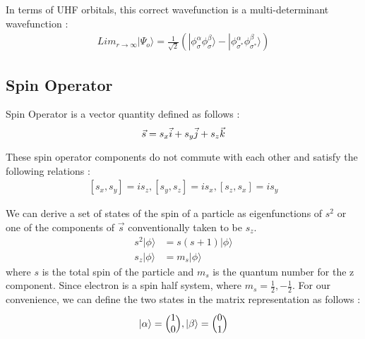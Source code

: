 \documentclass[11pt]{article}   	%
\begin{document}
	In terms of UHF orbitals, this correct  wavefunction is a multi-determinant wavefunction :\\
	\begin{equation}
	\begin{split}
		Lim_{r\rightarrow\infty}|\Psi_o\rangle=\frac{1}{\sqrt{2}}(|\phi_{\sigma}^{\alpha}
		\phi_{\sigma}^{\beta}\rangle-|\phi_{\sigma^*}^{\alpha}\phi_{\sigma^*}^{\beta}\rangle)
	\end{split}
	\end{equation}
	
\subsection{Spin Operator}
	Spin Operator is a vector quantity defined as follows :
	\begin{equation}
		\vec{s}=s_x \vec{i}+s_y\vec{j} + s_z\vec{k}\\
	\end{equation}
	
	These spin operator components do not commute with each other and satisfy the following relations :
	\begin{equation}
	\begin{split}
		[s_x,s_y]=is_z,   
		[s_y,s_z]=is_x,   
		[s_z,s_x]=is_y
	\end{split}
	\end{equation}
	
	We can derive a set of states of the spin of a particle as eigenfunctions of $s^2$ or one of the components of $\vec{s}$ conventionally taken to be $s_z$. \\
	\begin{equation}
	\begin{split}	
		s^2|\phi\rangle&=s(s+1)|\phi\rangle\\
		s_z|\phi\rangle&=m_s|\phi\rangle
	\end{split}
	\end{equation}
	where $s$ is the total spin of the particle and $m_s$ is the quantum number for the z component. 
	Since electron is a spin half system, where $m_s=\frac{1}{2} , -\frac{1}{2}$. 
	For our convenience, we can define the two states in the matrix representation as follows :\\
	\begin{equation}
		|\alpha\rangle=\Big(\begin{matrix} 1\\ 0\end{matrix}\Big), 
		|\beta\rangle=\Big(\begin{matrix} 0\\ 1\end{matrix}\Big)\\
	\end{equation}
	
\end{document}
